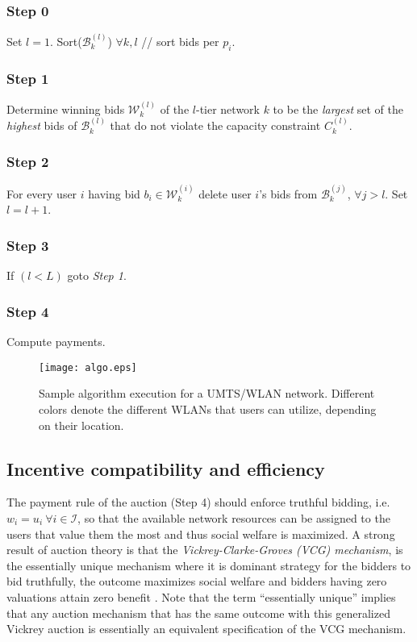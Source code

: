 \documentclass[a4paper]{article}
\begin{document}
\subsubsection*{Step 0} Set $l = 1$. Sort($\mathcal{B}_k^{(l)}$) $\forall k, l$ // sort bids per $p_i$.
\subsubsection*{Step 1} Determine winning bids $\mathcal{W}_k^{(l)}$ of the $l$-tier network $k$ 
to be the {\em largest} set of the {\em highest} bids of $\mathcal{B}_k^{(l)}$ that do not violate 
the capacity constraint $C_k^{(l)}$.
\subsubsection*{Step 2} For every user $i$ having bid $b_i \in \mathcal{W}_k^{(i)}$ delete 
user $i$'s bids from $\mathcal{B}_k^{(j)}$, $\forall j > l$.  
Set $l = l + 1$.
\subsubsection*{Step 3} If $(l < L)$ goto {\em Step 1}. 
\subsubsection*{Step 4} Compute payments.

\begin{figure}[htbp]
	\centering\texttt{[image: algo.eps]}
	\caption{Sample algorithm execution for a UMTS/WLAN network. Different
	colors denote the different WLANs that users can utilize, depending on their location.}
	\label{fig:algo}
\end{figure}

\subsection{Incentive compatibility and efficiency}
The payment rule of the auction (Step 4) should enforce truthful bidding,
i.e. $w_i = u_i \  \forall i \in \mathcal{I}$, so that the available network resources
can be assigned to the users that value them the most and thus social welfare is maximized. 
A strong result of auction theory is that the {\em Vickrey-Clarke-Groves (VCG) mechanism}, 
is the essentially unique mechanism where it is dominant strategy for the bidders to bid 
truthfully, the outcome maximizes social welfare and bidders having zero valuations 
attain zero benefit \cite{krishna}. Note that the term ``essentially unique'' implies that any 
auction mechanism that has the same outcome with this generalized Vickrey auction is
essentially an equivalent specification of the VCG mechanism.
\end{document}
